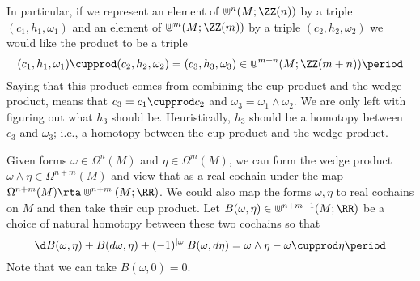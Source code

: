\begin{nul}
	In particular, if we represent an element of $\Cup^n(M;\ZZ(n)) $ by a triple $(c_1,h_1,\omega_1)$ and an element of $\Cup^m(M;\ZZ(m))$ by a triple $(c_2,h_2,\omega_2)$ we would like the product to be a triple
	\[
		(c_1,h_1,\omega_1)\cupprod(c_2,h_2,\omega_2)=(c_3,h_3,\omega_3)\in \Cup^{m+n}(M;\ZZ(m+n)) \period
	\]
	Saying that this product comes from combining the cup product and the wedge product, means that $c_3=c_1\cupprod c_2$ and $\omega_3=\omega_1\wedge\omega_2$. We are only left with figuring out what $h_3$ should be. 
	Heuristically, $h_3$ should be a homotopy between $c_3$ and $\omega_3$; i.e., a homotopy between the cup product and the wedge product. 
\end{nul}

\begin{nul}
	Given forms $\omega\in\Omega^n(M)$ and $\eta\in\Omega^m(M)$, we can form the wedge product $\omega\wedge \eta\in\Omega^{n+m}(M)$ and view that as a real cochain under the map $\Omega^{n+m}(M)\rta \Cup^{n+m}(M;\RR)$.  
	We could also map the forms $\omega,\eta$ to real cochains on $M$ and then take their cup product. 
	Let $B(\omega,\eta)\in \Cup^{n+m-1}(M;\RR)$ be a choice of natural homotopy between these two cochains so that 
	\[
		\d B(\omega,\eta)+B(d\omega,\eta)+(-1)^{|\omega|} B(\omega,d\eta)=\omega\wedge\eta-\omega\cupprod \eta \period
	\]
	Note that we can take $B(\omega,0)=0$. 
\end{nul}


